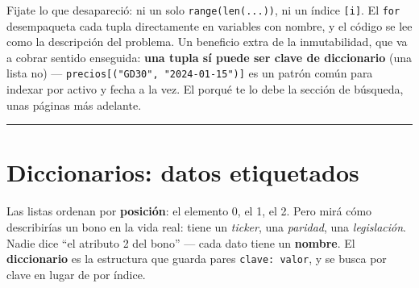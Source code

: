 \documentclass[
  spanish,
  letterpaper,
  DIV=11,
  numbers=noendperiod]{scrreprt}
\newenvironment{Shaded}{\begin{snugshade}}{\end{snugshade}}
\newcommand{\NormalTok}[1]{\textcolor[rgb]{0.00,0.23,0.31}{#1}}
\begin{document}
\begin{Shaded}
\end{Shaded}

Fijate lo que desapareció: ni un solo \texttt{range(len(...))}, ni un
índice \texttt{{[}i{]}}. El \texttt{for} desempaqueta cada tupla
directamente en variables con nombre, y el código se lee como la
descripción del problema. Un beneficio extra de la inmutabilidad, que va
a cobrar sentido enseguida: \textbf{una tupla sí puede ser clave de
diccionario} (una lista no) ---
\texttt{precios{[}("GD30",\ "2024-01-15"){]}} es un patrón común para
indexar por activo y fecha a la vez. El porqué te lo debe la sección de
búsqueda, unas páginas más adelante.

\begin{center}\rule{0.5\linewidth}{0.5pt}\end{center}

\section{Diccionarios: datos
etiquetados}\label{diccionarios-datos-etiquetados}

Las listas ordenan por \textbf{posición}: el elemento 0, el 1, el 2.
Pero mirá cómo describirías un bono en la vida real: tiene un
\emph{ticker}, una \emph{paridad}, una \emph{legislación}. Nadie dice
``el atributo 2 del bono'' --- cada dato tiene un \textbf{nombre}. El
\textbf{diccionario} es la estructura que guarda pares
\texttt{clave:\ valor}, y se busca por clave en lugar de por índice.
\end{document}
